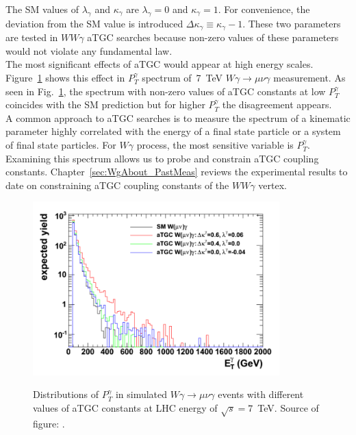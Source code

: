 The SM values of $\lambda_\gamma$ and $\kappa_\gamma$ are $\lambda_\gamma=0$ and $\kappa_\gamma=1$. For convenience, the deviation from the SM value is introduced $\Delta \kappa_\gamma \equiv \kappa_\gamma-1$. These two parameters are tested in $WW\gamma$ aTGC searches because non-zero values of these parameters would not violate any fundamental law.\\
The most significant effects of aTGC would appear at high energy scales. Figure~\ref{fig:aTGC_Pt_Wg} shows this effect in $P_T^\gamma$ spectrum of~7~TeV $W\gamma \rightarrow \mu\nu\gamma$ measurement. As seen in Fig.~\ref{fig:aTGC_Pt_Wg}, the spectrum with non-zero values of aTGC constants at low $P_T^{\gamma}$ coincides with the SM prediction but for higher $P_T^{\gamma}$ the disagreement appears.\\
A common approach to aTGC searches is to measure the spectrum of a kinematic parameter highly correlated with the energy of a final state particle or a system of final state particles. For $W\gamma$ process, the most sensitive variable is $P_T^\gamma$. Examining this spectrum allows us to probe and constrain aTGC coupling constants. Chapter~\ref{sec:WgAbout_PastMeas} reviews the experimental results to date on constraining aTGC coupling constants of the $WW\gamma$ vertex.\\ 
\begin{figure}[htb]
  \begin{center}
    {\includegraphics[width=0.85\textwidth]{../figs/WgAbout/aTGC_Pt_Wg.png}}
    \caption{Distributions of $P_T^\gamma$ in simulated $W\gamma\rightarrow\mu\nu\gamma$ events with different values of aTGC constants at LHC energy of $\sqrt{s}=7$~TeV. Source of figure:  \cite{ref_Senka_thesis}.}
    \label{fig:aTGC_Pt_Wg}
  \end{center}
\end{figure}

